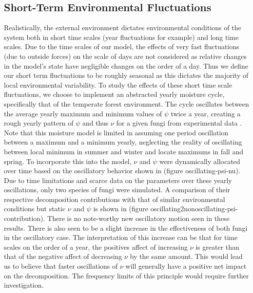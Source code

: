 \documentclass{article}
\begin{document}
\subsection{Short-Term Environmental Fluctuations}
Realistically, the external environment dictates environmental conditions of the system both in short time scales (year fluctuations for example) and long time scales. Due to the time scales of our model, the effects of very fast fluctuations (due to outside forces) on the scale of days are not considered as relative changes in the model's state have negligible changes on the order of a day. Thus we define our short term fluctuations to be roughly seasonal as this dictates the majority of local environmental variability. To study the effects of these short time scale fluctuations, we choose to implement an abstracted yearly moisture cycle, specifically that of the temperate forest environment. The cycle oscillates between the average yearly maximum and minimum values of $\psi$ twice a year, creating a rough yearly pattern of $\psi$ and thus $\nu$ for a given fungi from experimental data \cite{Zobel2001}\cite{Maynard2019}. Note that this moisture model is limited in assuming one period oscillation between a maximum and a minimum yearly, neglecting the reality of oscillating between local minimum in summer and winter and locate maximums in fall and spring. To incorporate this into the model, $\nu$ and $\psi$ were dynamically allocated over time based on the oscillatory behavior shown in (figure oscillating-psi-nu). Due to time limitations and scarce data on the parameters over these yearly oscillations, only two species of fungi were simulated. A comparison of their respective decomposition contributions with that of similar environmental conditions but static $\nu$ and $\psi$ is shown in (figure oscillating2nonoscillating-psi-contribution). There is no note-worthy new oscillatory motion seen in these results. There is also seen to be a slight increase in the effectiveness of both fungi in the oscillatory case. The interpretation of this increase can be that for time scales on the order of a year, the positives affect of increasing $\nu$ is greater than that of the negative affect of decreasing $\nu$ by the same amount. This would lead us to believe that faster oscillations of $\nu$ will generally have a positive net impact on the decomposition. The frequency limits of this principle would require further investigation.
\end{document}
